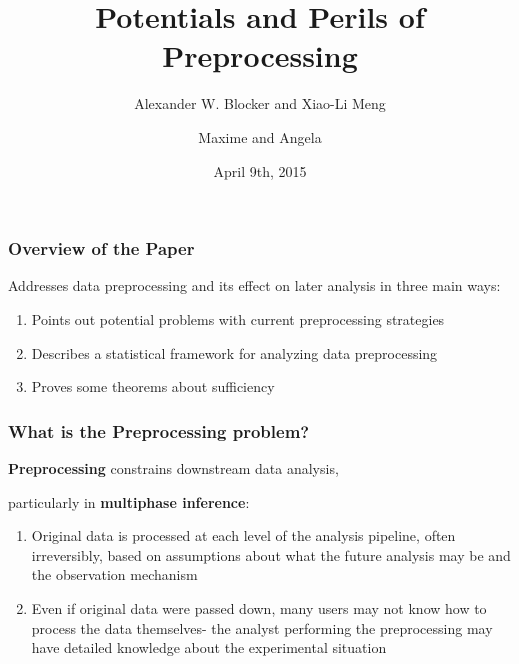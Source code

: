 \documentclass[10pt, compress]{beamer}
\title{Potentials and Perils of Preprocessing}
\subtitle{Alexander W. Blocker and Xiao-Li Meng}
\date{April 9th, 2015}
\author{Maxime and Angela}
\begin{document}
\maketitle

\begin{frame}[fragile]
    \frametitle{Overview of the Paper}
    
    Addresses data preprocessing and its effect on later analysis in three main ways:
    \begin{enumerate}
    \item Points out potential problems with current preprocessing strategies
    \item Describes a statistical framework for analyzing data preprocessing
    \item Proves some theorems about sufficiency 
    \end{enumerate}

\end{frame}

\begin{frame}[fragile]
    \frametitle{What is the Preprocessing problem?}
  
  \begin{center}
    \textbf{Preprocessing} constrains downstream data analysis, 
    
    particularly in \textbf{multiphase inference}:
  \end{center}
  
    \begin{enumerate}[<+->]
    \item Original data is processed at each level of the analysis pipeline, often irreversibly, based on assumptions about what the future analysis may be and the observation mechanism
    \vspace*{5mm}
    \item Even if original data were passed down, many users may not know how to process the data themselves- the analyst performing the preprocessing may have detailed knowledge about the experimental situation
  \end{enumerate}
  
\end{frame}
\end{document}

